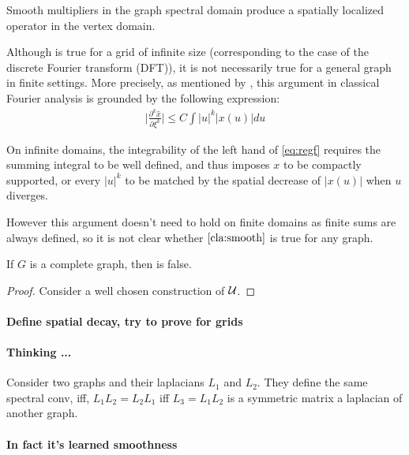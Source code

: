 \begin{claim} Smooth multipliers in the graph spectral domain produce a spatially localized operator in the vertex domain.
\label{cla:smooth}
\end{claim}

Although  is true for a grid of infinite size (corresponding to the case of the discrete Fourier transform (DFT)), it is not necessarily true for a general graph in finite settings. More precisely, as mentioned by \cite{henaff2015deep}, this argument in classical Fourier analysis is grounded by the following expression:
\begin{gather}
\bigg|\frac{\partial^k{\hat{x}}}{\partial{\xi^k}}\bigg| \leq C \int |u|^k|x(u)|du \label{eq:regf}
\end{gather}

On infinite domains, the integrability of the left hand of \eqref{eq:regf} requires the summing integral to be well defined, and thus imposes $x$ to be compactly supported, or every $|u|^k$ to be matched by the spatial decrease of $|x(u)|$ when $u$ diverges.

However this argument doesn't need to hold on finite domains as finite sums are always defined, so it is not clear whether $\ref{cla:smooth}$ is true for any graph.

\begin{proposition} If $G$ is a complete graph, then  is false.
\end{proposition}

\begin{proof}
Consider a well chosen construction of $\mathcal{U}$.
\end{proof}

\paragraph{Define spatial decay, try to prove for grids}

\paragraph{Thinking ...}
Consider two graphs and their laplacians $L_1$ and $L_2$. They define the same spectral conv, iff, $L_1L_2 = L_2L_1$ iff $L_3 = L_1L_2$ is a symmetric matrix \ie a laplacian of another graph.

\paragraph{In fact it's learned smoothness}

